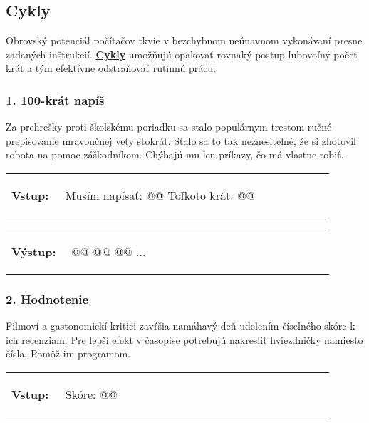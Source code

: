 \subsection{Cykly}
Obrovský potenciál počítačov tkvie v bezchybnom neúnavnom vykonávaní presne zadaných inštrukcií. \underline{\textbf{Cykly}} umožňujú opakovať rovnaký postup ľubovoľný počet krát a tým efektívne odstraňovať rutinnú prácu.


\subsubsection*{1. 100-krát napíš}
Za prehrešky proti školskému poriadku sa stalo populárnym trestom ručné prepisovanie mravoučnej vety stokrát. Stalo sa to tak neznesiteľné, že si zhotovil robota na pomoc záškodníkom. Chýbajú mu len príkazy, čo má vlastne robiť.

\begin{tabular}{@{}p{0.15\linewidth}p{0.75\linewidth}}
\textbf{\small Vstup:} &
\vspace{-3em}
\begin{code}
Musím napísať: @\fbox{\phantom{vstup}}@
Toľkoto krát: @\fbox{\phantom{vstup}}@
\end{code}
\end{tabular}

\vspace{-2em}
\begin{tabular}{@{}p{0.15\linewidth}p{0.75\linewidth}}
\textbf{\small Výstup:} &
\vspace{-3em}
\begin{code}
@\fbox{\phantom{vstup}}@
@\fbox{\phantom{vstup}}@
@\fbox{\phantom{vstup}}@
...
\end{code}
\end{tabular}
\vspace{-2em}


\subsubsection*{2. Hodnotenie}
Filmoví a gastonomickí kritici zavŕšia namáhavý deň udelením číselného skóre k ich recenziam. Pre lepší efekt v časopise potrebujú nakresliť hviezdničky namiesto čísla. Pomôž im programom.

\begin{tabular}{@{}p{0.15\linewidth}p{0.75\linewidth}}
\textbf{\small Vstup:} &
\vspace{-3em}
\begin{code}
Skóre: @\fbox{5}@
\end{code}
\end{tabular}

